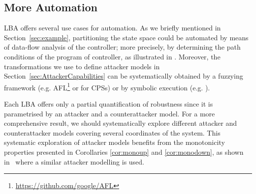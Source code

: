 {\subsection{More Automation}
LBA offers several use cases for automation. As we briefly mentioned in Section~\ref{sec:example}, partitioning the state space could be automated by means of data-flow analysis of the controller; more precisely, by determining the path conditions of the program of controller, as illustrated in \cite{castellanos2021AttkFinder}. Moreover, the transformations we use to define attacker models in Section~\ref{sec:AttackerCapabilities} can be systematically obtained by a fuzzying framework (e.g. AFL\footnote{\url{https://github.com/google/AFL}} or \cite{chen2019learning} for CPSs) or by symbolic execution (e.g. \cite{castellanos2021AttkFinder}).


Each LBA offers only a partial quantification of robustness since it is parametrised by an attacker and a counterattacker model. For a more comprehensive result, we should systematically explore different attacker and counterattacker models covering several coordinates of the system. This systematic exploration of attacker models benefits from the monotonicity properties presented in Corollaries \ref{cor:monoup} and \ref{cor:monodown}, as shown in~\cite{SystematicClassification} where a similar attacker modelling is used.


}

